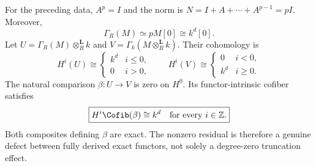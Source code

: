 \begin{theorem}\label{thm:nonflat-invariant-exchange}
For the preceding data, $A^p=I$ and the norm is $N=I+A+\cdots+A^{p-1}=pI$. Moreover,
\[
 \Gamma_R(M)\simeq pM[0]\cong k^d[0].
\]
Let $U=\Gamma_R(M)\otimes_R^{\mathbf L}k$ and $V=\Gamma_k(M\otimes_R^{\mathbf L}k)$. Their cohomology is
\[
 H^i(U)\cong\begin{cases}k^d&i\leq0,\\0&i>0,\end{cases}
 \qquad
 H^i(V)\cong\begin{cases}0&i<0,\\k^d&i\geq0.\end{cases}
\]
The natural comparison $\beta:U\to V$ is zero on $H^0$. Its functor-intrinsic cofiber satisfies
\[
 \boxed{H^i\Cofib(\beta)\cong k^d\quad\text{for every }i\in\mathbb Z.}
\]
Both composites defining $\beta$ are exact. The nonzero residual is therefore a genuine defect between fully derived exact functors, not solely a degree-zero truncation effect.
\end{theorem}

